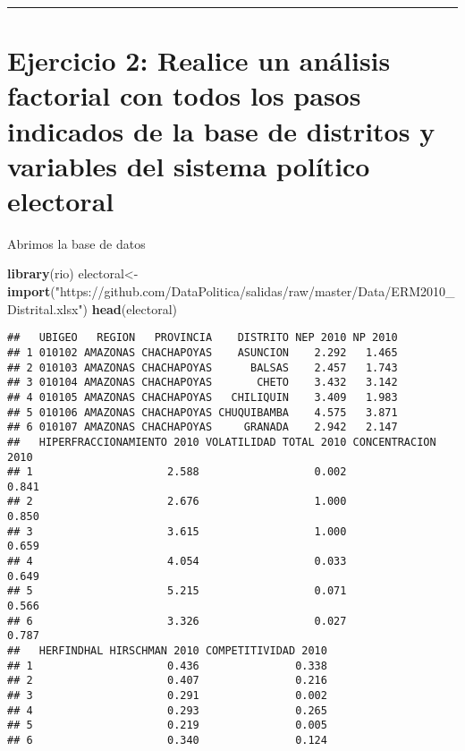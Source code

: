 \documentclass[
]{article}
\newenvironment{Shaded}{\begin{snugshade}}{\end{snugshade}}
\newcommand{\KeywordTok}[1]{\textcolor[rgb]{0.13,0.29,0.53}{\textbf{#1}}}
\newcommand{\NormalTok}[1]{#1}
\newcommand{\StringTok}[1]{\textcolor[rgb]{0.31,0.60,0.02}{#1}}
\begin{document}
\begin{center}\rule{0.5\linewidth}{0.5pt}\end{center}

\hypertarget{ejercicio-2-realice-un-anuxe1lisis-factorial-con-todos-los-pasos-indicados-de-la-base-de-distritos-y-variables-del-sistema-poluxedtico-electoral}{%
\section{Ejercicio 2: Realice un análisis factorial con todos los pasos
indicados de la base de distritos y variables del sistema político
electoral}\label{ejercicio-2-realice-un-anuxe1lisis-factorial-con-todos-los-pasos-indicados-de-la-base-de-distritos-y-variables-del-sistema-poluxedtico-electoral}}

Abrimos la base de datos

\begin{Shaded}
\begin{Highlighting}[]
\KeywordTok{library}\NormalTok{(rio)}
\NormalTok{electoral<-}\StringTok{ }\KeywordTok{import}\NormalTok{(}\StringTok{"https://github.com/DataPolitica/salidas/raw/master/Data/ERM2010_Distrital.xlsx"}\NormalTok{)}
\KeywordTok{head}\NormalTok{(electoral)}
\end{Highlighting}
\end{Shaded}

\begin{verbatim}
##   UBIGEO   REGION   PROVINCIA    DISTRITO NEP 2010 NP 2010
## 1 010102 AMAZONAS CHACHAPOYAS    ASUNCION    2.292   1.465
## 2 010103 AMAZONAS CHACHAPOYAS      BALSAS    2.457   1.743
## 3 010104 AMAZONAS CHACHAPOYAS       CHETO    3.432   3.142
## 4 010105 AMAZONAS CHACHAPOYAS   CHILIQUIN    3.409   1.983
## 5 010106 AMAZONAS CHACHAPOYAS CHUQUIBAMBA    4.575   3.871
## 6 010107 AMAZONAS CHACHAPOYAS     GRANADA    2.942   2.147
##   HIPERFRACCIONAMIENTO 2010 VOLATILIDAD TOTAL 2010 CONCENTRACION 2010
## 1                     2.588                  0.002              0.841
## 2                     2.676                  1.000              0.850
## 3                     3.615                  1.000              0.659
## 4                     4.054                  0.033              0.649
## 5                     5.215                  0.071              0.566
## 6                     3.326                  0.027              0.787
##   HERFINDHAL HIRSCHMAN 2010 COMPETITIVIDAD 2010
## 1                     0.436               0.338
## 2                     0.407               0.216
## 3                     0.291               0.002
## 4                     0.293               0.265
## 5                     0.219               0.005
## 6                     0.340               0.124
\end{verbatim}
\end{document}
